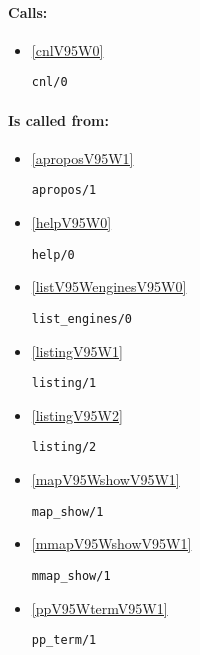 \paragraph{Calls:} 
\begin{itemize}
\item \ref{cnlV95W0} 
\begin{verbatim}
cnl/0
\end{verbatim}

\end{itemize}
\paragraph{Is called from:} 
\begin{itemize}
\item \ref{aproposV95W1} 
\begin{verbatim}
apropos/1
\end{verbatim}

\item \ref{helpV95W0} 
\begin{verbatim}
help/0
\end{verbatim}

\item \ref{listV95WenginesV95W0} 
\begin{verbatim}
list_engines/0
\end{verbatim}

\item \ref{listingV95W1} 
\begin{verbatim}
listing/1
\end{verbatim}

\item \ref{listingV95W2} 
\begin{verbatim}
listing/2
\end{verbatim}

\item \ref{mapV95WshowV95W1} 
\begin{verbatim}
map_show/1
\end{verbatim}

\item \ref{mmapV95WshowV95W1} 
\begin{verbatim}
mmap_show/1
\end{verbatim}

\item \ref{ppV95WtermV95W1} 
\begin{verbatim}
pp_term/1
\end{verbatim}


\end{itemize}
